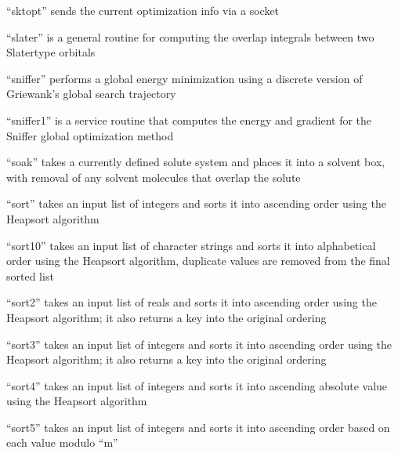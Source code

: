 \documentclass[letterpaper,11pt,english]{sphinxmanual}
\begin{document}

“sktopt” sends the current optimization info via a socket


“slater” is a general routine for computing the overlap
integrals between two Slater\sphinxhyphen{}type orbitals


“sniffer” performs a global energy minimization using a
discrete version of Griewank’s global search trajectory


“sniffer1” is a service routine that computes the energy
and gradient for the Sniffer global optimization method


“soak” takes a currently defined solute system and places
it into a solvent box, with removal of any solvent molecules
that overlap the solute


“sort” takes an input list of integers and sorts it
into ascending order using the Heapsort algorithm


“sort10” takes an input list of character strings and sorts
it into alphabetical order using the Heapsort algorithm,
duplicate values are removed from the final sorted list


“sort2” takes an input list of reals and sorts it
into ascending order using the Heapsort algorithm;
it also returns a key into the original ordering


“sort3” takes an input list of integers and sorts it
into ascending order using the Heapsort algorithm;
it also returns a key into the original ordering


“sort4” takes an input list of integers and sorts it into
ascending absolute value using the Heapsort algorithm


“sort5” takes an input list of integers and sorts it
into ascending order based on each value modulo “m”
\end{document}
